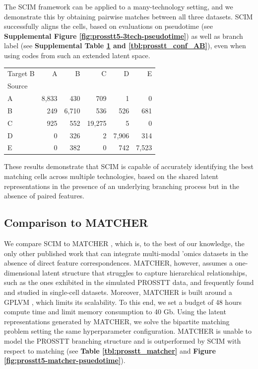 The SCIM framework can be applied to a many-technology setting, and we demonstrate this by obtaining pairwise matches between all three datasets. 
SCIM successfully aligns the cells, based on evaluations on pseudotime (see \textbf{Supplemental Figure \ref{fig:prosstt5-3tech-pseudotime}}) as well as branch label (see \textbf{Supplemental Table \ref{tbl:prosstt_conf_SB} and  \ref{tbl:prosstt_conf_AB}}), even when using codes from such an extended latent space. 

\begin{table}%
\begin{tabular}{lrrrrr}
\toprule
Target B &     A &     B &      C &     D &     E \\
Source &       &       &        &       &       \\
\midrule
A      &  8,833 &   430 &    709 &     1 &     0 \\
B      &   249 &  6,710 &    536 &   526 &   681 \\
C      &   925 &   552 &  19,275 &     5 &     0 \\
D      &     0 &   326 &      2 &  7,906 &   314 \\
E      &     0 &   382 &      0 &   742 &  7,523 \\
\bottomrule
\end{tabular}
\label{tbl:prosstt_conf_SB}
\end{table}

These results demonstrate that SCIM is capable of accurately identifying the best matching cells across multiple technologies, based on the shared latent representations in the presence of an underlying branching process but in the absence of paired features.

\subsection{Comparison to MATCHER}
We compare SCIM to MATCHER \citep{Welch2017}, which is, to the best of our knowledge, the only other published work that can integrate multi-modal 'omics datasets in the absence of direct feature correspondences.
MATCHER, however, assumes a one-dimensional latent structure that struggles to capture hierarchical relationships, such as the ones exhibited in the simulated PROSSTT data, and frequently found and studied in single-cell datasets.
Moreover, MATCHER is built around a GPLVM \citep{Lawrence2004}, which limits its scalability.
To this end, we set a budget of 48 hours compute time and limit memory consumption to 40 Gb.
Using the latent representations generated by MATCHER, we solve the bipartite matching problem setting the same hyperparameter configuration.
MATCHER is unable to model the PROSSTT branching structure and is outperformed by SCIM with respect to matching (see \textbf{Table  \ref{tbl:prosstt_matcher}} and \textbf{Figure \ref{fig:prosstt5-matcher-psuedotime}}).


